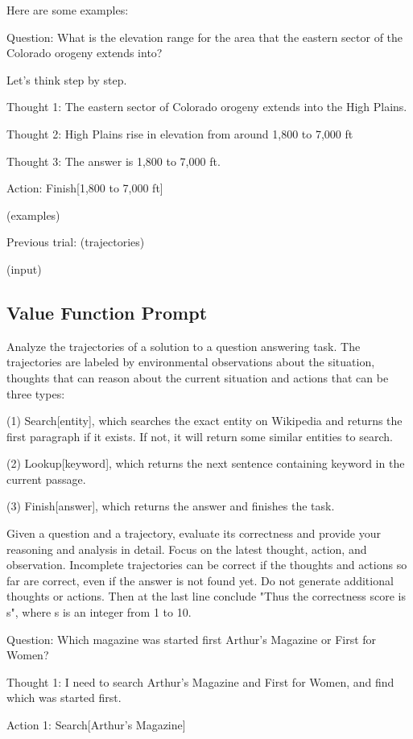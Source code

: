 \documentclass{article} \usepackage{iclr2024_conference,times}
\begin{document}
Here are some examples:

Question: What is the elevation range for the area that the eastern sector of the Colorado orogeny extends into? 

Let's think step by step.

Thought 1: The eastern sector of Colorado orogeny extends into the High Plains. 

Thought 2: High Plains rise in elevation from around 1,800 to 7,000 ft

Thought 3: The answer is 1,800 to 7,000 ft.

Action: Finish[1,800 to 7,000 ft]

(examples)

Previous trial:
(trajectories)

(input)

\subsection{Value Function Prompt}

Analyze the trajectories of a solution to a question answering task. The trajectories are labeled by environmental observations about the situation, thoughts that can reason about the current situation and actions that can be three types: 

(1) Search[entity], which searches the exact entity on Wikipedia and returns the first paragraph if it exists. If not, it will return some similar entities to search.

(2) Lookup[keyword], which returns the next sentence containing keyword in the current passage.

(3) Finish[answer], which returns the answer and finishes the task.

Given a question and a trajectory, evaluate its correctness and provide your reasoning and analysis in detail. Focus on the latest thought, action, and observation. Incomplete trajectories can be correct if the thoughts and actions so far are correct, even if the answer is not found yet. Do not generate additional thoughts or actions. Then at the last line conclude "Thus the correctness score is {s}", where s is an integer from 1 to 10.

Question: Which magazine was started first Arthur's Magazine or First for Women?

Thought 1: I need to search Arthur's Magazine and First for Women, and find which was started first.

Action 1: Search[Arthur's Magazine]
\end{document}
